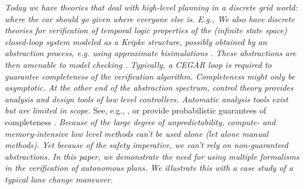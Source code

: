 {\it Today we have theories that deal with high-level planning in a discrete grid world: where the car should go given where everyone else is. E.g., \cite{WongpiromsarnTM10hscc} }
{\it We also have discrete theories for verification of temporal logic properties of the (infinite state space) closed-loop system modeled as a Kripke structure, possibly obtained by an abstraction process, e.g. using approximate bisimulations . 
	These abstractions are then amenable to model checking .
	Typically, a CEGAR loop is required to guarantee completeness of the verification algorithm. Completeness might only be asymptotic.}
{\it At the other end of the abstraction spectrum, control theory provides analysis and design tools of low level controllers. Automatic analysis tools exist but are limited in scope.}
See, e.g., , or provide probabilistic guarantees of completeness .
{\it Because of the large degree of unpredictability, compute- and memory-intensive low level methods can't be used alone (let alone manual methods). 
	Yet because of the safety imperative, we can't rely on non-guaranteed abstractions.  
	In this paper, we demonstrate the need for using multiple formalisms in the verification of autonomous plans. 
	We illustrate this with a case study of a typical lane change maneuver.}

